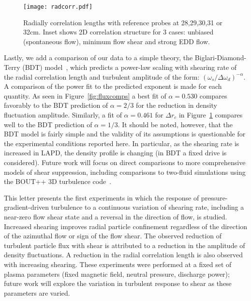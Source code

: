 \documentclass[aps,prl,amsmath,amssymb,preprint,superscriptaddress]{revtex4}
\begin{document}
\begin{figure}[!htbp]
\centerline{
\texttt{[image: radcorr.pdf]}}
\caption{\label{fig:radcorr} Radially correlation lengths with
  reference probes at 28,29,30,31 or 32cm. Inset shows 2D correlation
  structure for 3 cases: unbiased (spontaneous flow), minimum flow
  shear and strong EDD flow.}
\end{figure}

Lastly, we add a comparison of our data to a simple theory, the
Biglari-Diamond-Terry (BDT) model~\cite{biglari90}, which predicts a
power-law scaling with shearing rate of the radial correlation length and turbulent
amplitude of the form: $\left(\omega_{s}/\Delta
\omega_{d}\right)^{-\alpha}$. A comparison of the power fit to the
predicted exponent is made for each quantity. As seen in
Figure~\ref{fig:fluxcomps} a best fit of $\alpha = 0.530$ compares
favorably to the BDT prediction of $\alpha = 2/3$ for the reduction in
density fluctuation amplitude. Similarly, a fit of $\alpha = 0.461$
for $\Delta r_{c}$ in Figure~\ref{fig:radcorr} compares well to the BDT
prediction of $\alpha = 1/3$.   It should be noted, however, that the
BDT model is fairly simple and the validity of its assumptions is
questionable for the experimental conditions reported here.  In
particular, as the shearing rate is increased in LAPD, the density
profile is changing (in BDT a fixed drive is considered).  Future work
will focus on direct comparisons to more comprehensive models of shear
suppression, including comparisons to two-fluid simulations using the
BOUT++ 3D turbulence code~\cite{umansky11}.  

This letter presents the first experiments in which the response of
pressure-gradient-driven turbulence to a continuous
variation of shearing rate, including a near-zero flow shear state and
a reversal in the direction of flow, is studied.  Increased shearing
improves radial particle confinement regardless of the direction of
the azimuthal flow or sign of the flow shear. The observed reduction of
turbulent particle flux with shear is attributed to a reduction in the
amplitude of density fluctuations.  A reduction in the radial
correlation length is also observed with increasing shearing. These
experiments were performed at a fixed set of plasma parameters (fixed
magnetic field, neutral pressure, discharge power); future work will
explore the variation in turbulent response to shear as these
parameters are varied.  

\end{document}
